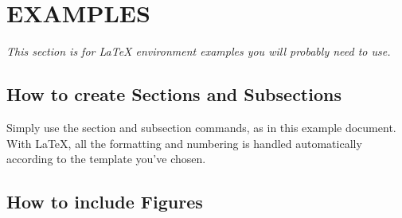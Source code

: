 \documentclass[11pt,twocolumn]{article}
\begin{document}
	
	

%
%
%



\section{EXAMPLES}
\label{sec:examples}

\textit{This section is for \LaTeX{} environment examples you will probably need to use.}

\subsection{How to create Sections and Subsections}

Simply use the section and subsection commands, as in this example document. With \LaTeX{}, all the formatting and numbering is handled automatically according to the template you've chosen.

\subsection{How to include Figures}
\end{document}
